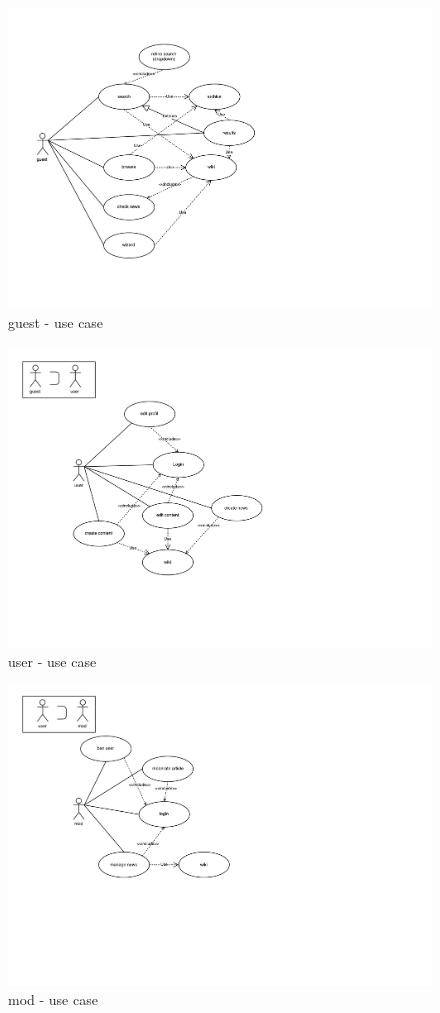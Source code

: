 \begin{figure}[h] 
    \centering
    \includegraphics[scale=1.0]{Pictures/Guest}
    \caption{guest - use case}
\end{figure}

\begin{figure}[h] 
    \centering
    \includegraphics[scale=1.0]{Pictures/User}
    \caption{user - use case}
\end{figure}

\begin{figure}[h] 
    \centering
    \includegraphics[scale=1.0]{Pictures/Mod}
    \caption{mod - use case}
\end{figure}

